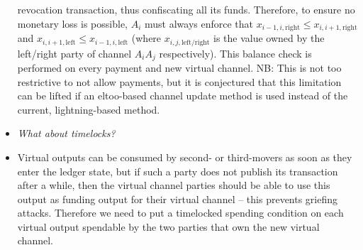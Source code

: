 \begin{itemize}
  revocation transaction, thus confiscating all its funds. Therefore, to ensure
  no monetary loss is possible, $A_i$ must always enforce that $x_{i-1, i,
  \mathrm{right}} \leq x_{i, i+1, \mathrm{right}}$ and $x_{i, i+1,
  \mathrm{left}} \leq x_{i-1, i, \mathrm{left}}$ (where $x_{i, j,
  \mathrm{left/right}}$ is the value owned by the left/right party of channel
  $A_i A_j$ respectively). This balance check is performed on every payment and
  new virtual channel. NB: This is not too restrictive to not allow payments,
  but it is conjectured that this limitation can be lifted if an eltoo-based
  channel update method is used instead of the current, lightning-based method.
  \item \emph{What about timelocks?}
  \item Virtual outputs can be consumed by second- or third-movers as
  soon as they enter the ledger state, but if such a party does not publish its
  transaction after a while, then the virtual channel parties should be able to
  use this output as funding output for their virtual channel -- this prevents
  griefing attacks. Therefore we need to put a timelocked spending condition on
  each virtual output spendable by the two parties that own the new virtual
  channel.


\end{itemize}
